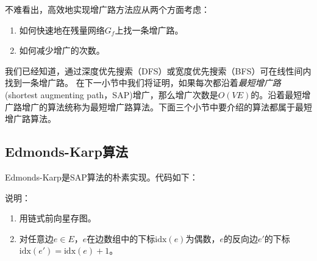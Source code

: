 \documentclass{ctexbook}
\newcommand{\idx}{\mathrm{idx}}
\begin{document}
    不难看出，高效地实现增广路方法应从两个方面考虑：
    \begin{enumerate}
        \item 如何快速地在残量网络$G_f$上找一条增广路。\label{Approach:1}
        \item 如何减少增广的次数。\label{Approach:2}
    \end{enumerate}
    我们已经知道，通过深度优先搜索（DFS）或宽度优先搜索（BFS）可在线性间内找到一条增广路。
    在下一小节中我们将证明，如果每次都沿着\emph{最短增广路}(shortest augmenting path，SAP)增广，那么增广次数是$O(VE)$的。沿着最短增广路增广的算法统称为最短增广路算法。下面三个小节中要介绍的算法都属于最短增广路算法。
    \subsection{Edmonds-Karp算法}
    Edmonds-Karp是SAP算法的朴素实现。代码如下：
    
    说明：
    \begin{enumerate}
        \item 用链式前向星存图。
        \item 对任意边$e \in E$，$e$在边数组中的下标$\idx(e)$为偶数，$e$的反向边$e'$的下标$\idx(e') = \idx(e) + 1$。
    \end{enumerate}
\end{document}
